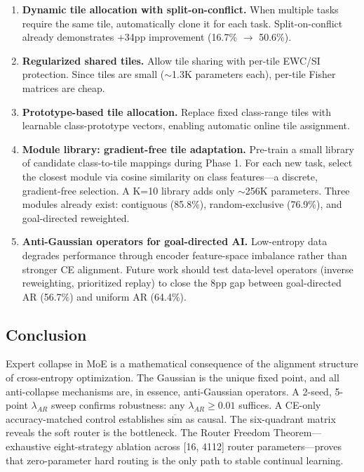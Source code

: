 \documentclass[twoside]{article}
\theoremstyle{definition}
\begin{document}
\begin{enumerate}
    \item \textbf{Dynamic tile allocation with split-on-conflict.} When multiple tasks require the same tile, automatically clone it for each task. Split-on-conflict already demonstrates +34pp improvement (16.7\% $\to$ 50.6\%).

    \item \textbf{Regularized shared tiles.} Allow tile sharing with per-tile EWC/SI protection. Since tiles are small ($\sim$1.3K parameters each), per-tile Fisher matrices are cheap.

    \item \textbf{Prototype-based tile allocation.} Replace fixed class-range tiles with learnable class-prototype vectors, enabling automatic online tile assignment.

    \item \textbf{Module library: gradient-free tile adaptation.} Pre-train a small library of candidate class-to-tile mappings during Phase 1. For each new task, select the closest module via cosine similarity on class features---a discrete, gradient-free selection. A K=10 library adds only $\sim$256K parameters. Three modules already exist: contiguous (85.8\%), random-exclusive (76.9\%), and goal-directed reweighted.

    \item \textbf{Anti-Gaussian operators for goal-directed AI.} Low-entropy data degrades performance through encoder feature-space imbalance rather than stronger CE alignment. Future work should test data-level operators (inverse reweighting, prioritized replay) to close the 8pp gap between goal-directed AR (56.7\%) and uniform AR (64.4\%).
\end{enumerate}

\subsection{Conclusion}

Expert collapse in MoE is a mathematical consequence of the alignment structure of cross-entropy optimization. The Gaussian is the unique fixed point, and all anti-collapse mechanisms are, in essence, anti-Gaussian operators. A 2-seed, 5-point $\lambda_{AR}$ sweep confirms robustness: any $\lambda_{AR} \geq 0.01$ suffices. A CE-only accuracy-matched control establishes $\overline{\text{sim}}$ as causal. The six-quadrant matrix reveals the soft router is the bottleneck. The Router Freedom Theorem---exhaustive eight-strategy ablation across [16, 4112] router parameters---proves that zero-parameter hard routing is the only path to stable continual learning.
\end{document}
